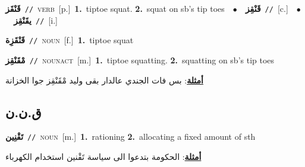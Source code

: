 \documentclass[10pt,a4paper,twoside]{article} %
\begin{document}
\begin{multicols}{2}
{\setlength\topsep{0pt}\textbf{\foreignlanguage{arabic}{قَنْقَز}}\ {\color{gray}\texttt{//}\color{black}}\ \textsc{verb}\ [p.]\ \textbf{1.}~tiptoe squat.  \textbf{2.}~squat on sb's tip toes\ \ $\bullet$\ \ \setlength\topsep{0pt}\textbf{\foreignlanguage{arabic}{قَنْقِز}}\ {\color{gray}\texttt{//}\color{black}}\ [c.]\ \ $\bullet$\ \ \setlength\topsep{0pt}\textbf{\foreignlanguage{arabic}{يقَنْقِز}}\ {\color{gray}\texttt{//}\color{black}}\ [i.]\ } \vspace{2mm}

{\setlength\topsep{0pt}\textbf{\foreignlanguage{arabic}{قَنْقَزِة}}\ {\color{gray}\texttt{//}\color{black}}\ \textsc{noun}\ [f.]\ \textbf{1.}~tiptoe squat\ } \vspace{2mm}

{\setlength\topsep{0pt}\textbf{\foreignlanguage{arabic}{مْقَنْقِز}}\ {\color{gray}\texttt{//}\color{black}}\ \textsc{noun\textunderscore act}\ [m.]\ \textbf{1.}~tiptoe squatting.  \textbf{2.}~squatting on sb's tip toes\  \begin{flushright}\color{gray}\foreignlanguage{arabic}{\textbf{\underline{\foreignlanguage{arabic}{أمثلة}}}: بس فات الجندي عالدار بقى وليد مْقَنْقِز جوا الخزانة}\end{flushright}\color{black}} \vspace{2mm}

\vspace{-3mm}
\subsection*{\color{blue}\foreignlanguage{arabic}{ق.ن.ن}\color{blue}{}} 

{\setlength\topsep{0pt}\textbf{\foreignlanguage{arabic}{تَقْنِين}}\ {\color{gray}\texttt{//}\color{black}}\ \textsc{noun}\ [m.]\ \textbf{1.}~rationing  \textbf{2.}~allocating a fixed amount of sth\  \begin{flushright}\color{gray}\foreignlanguage{arabic}{\textbf{\underline{\foreignlanguage{arabic}{أمثلة}}}: الحكومة بتدعوا الى سياسة تَقْنين استخدام الكهرباء}\end{flushright}\color{black}} \vspace{2mm}


\end{multicols}
\end{document}
